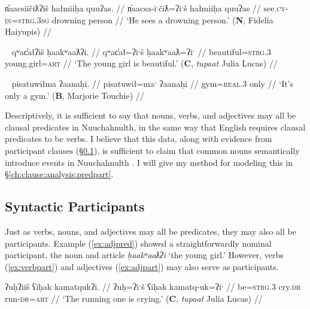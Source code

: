 \begin{comment}
While all three words have semantic relations (\textsc{see}, \textsc{drown}, \textsc{person}), only one is the syntactic predicate of the sentence.	
\end{comment}

\ex \label{ex:verbpred}
\begingl
\glpreamble n̓aacsiičiƛʔiš hałmiiḥa quuʔas. //
\gla n̓aacsa-iˑčiƛ=ʔiˑš hałmiiḥa quuʔas //
\glb see.\textsc{cv}-\textsc{in}=\textsc{strg.3sg} drowning person //
\glft `He sees a drowning person.' (\textbf{N}, Fidelia Haiyupis) //
\endgl
\xe

\ex~ \label{ex:adjpred}
\begingl
\glpreamble qʷac̓ałʔiš ḥaakʷaaƛʔi. //
\gla qʷac̓ał=ʔiˑš ḥaakʷaaƛ=ʔiˑ //
\glb beautiful=\textsc{strg.3} young.girl=\textsc{art} //
\glft `The young girl is beautiful.' (\textbf{C}, \textit{tupaat} Julia Lucas) //
\endgl
\xe

\ex~ \label{ex:nounpred}
\begingl
\glpreamble pisatuwiłma ʔaanaḥi. //
\gla pisatuwił=maˑ ʔaanaḥi //
\glb gym=\textsc{real.3} only //
\glft `It's only a gym.' (\textbf{B}, Marjorie Touchie) //
\endgl
\xe

Descriptively, it is sufficient to say that nouns, verbs, and adjectives may all be clausal predicates in Nuuchahnulth, in the same way that English requires clausal predicates to be verbs. I believe that this data, along with evidence from participant clauses (\S\ref{ch:clause:partp}), is sufficient to claim that common nouns semantically introduce events in Nuuchahnulth \citep{inman2018}. I will give my method for modeling this in \S\ref{ch:clause:analysis:predpart}.

\subsection{Syntactic Participants} \label{ch:clause:partp}

Just as verbs, nouns, and adjectives may all be predicates, they may also all be participants. Example (\ref{ex:adjpred}) showed a straightforwardly nominal participant, the noun and article \textit{ḥaakʷaaƛʔi} `the young girl.' However, verbs (\ref{ex:verbpart}) and adjectives (\ref{ex:adjpart}) may also serve as participants.

\ex \label{ex:verbpart}
\begingl
\glpreamble ʔuḥʔiiš ʕiḥak kamatqukʔi. //
\gla ʔuḥ=ʔiˑš ʕiḥak kamatq-uk=ʔiˑ //
\glb be=\textsc{strg.3} cry.\textsc{dr} run-\textsc{dr}=\textsc{art} //
\glft `The running one is crying.' (\textbf{C}, \textit{tupaat} Julia Lucas) //
\endgl
\xe

